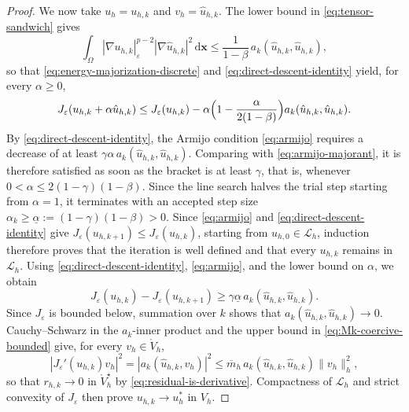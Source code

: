 \documentclass[11pt,pdflatex,sn-mathphys-num]{sn-jnl}
\theoremstyle{thmstyleone}%
\theoremstyle{thmstyletwo}%
\theoremstyle{thmstylethree}%
\newcommand{\bs}[1]{\ensuremath{\boldsymbol{#1}}}
\begin{document}
\begin{proof}
We now take $u_h=u_{h,k}$ and $v_h=\hat u_{h,k}$. The lower bound in \eqref{eq:tensor-sandwich} gives
\begin{equation*}
  \int_\Omega|\nabla u_{h,k}|_\varepsilon^{p-2}|\nabla\hat u_{h,k}|^2\,\mathrm{d}\bs x
  \le\frac{1}{1-\beta}\,a_k(\hat u_{h,k},\hat u_{h,k}),
\end{equation*}
so that \eqref{eq:energy-majorization-discrete} and \eqref{eq:direct-descent-identity} yield, for every $\alpha\ge0$,
\begin{equation}\label{eq:armijo-majorant}
  J_\varepsilon(u_{h,k}+\alpha\hat u_{h,k})
  \le J_\varepsilon(u_{h,k})
  -\alpha\Bigl(1-\frac{\alpha}{2(1-\beta)}\Bigr)
   a_k(\hat u_{h,k},\hat u_{h,k}).
\end{equation}
By \eqref{eq:direct-descent-identity}, the Armijo condition \eqref{eq:armijo} requires a decrease of at least $\gamma\alpha\,a_k(\hat u_{h,k},\hat u_{h,k})$. Comparing with \eqref{eq:armijo-majorant}, it is therefore satisfied as soon as the bracket is at least $\gamma$, that is,
whenever $0<\alpha\le2(1-\gamma)(1-\beta)$. Since the line search halves the trial step
starting from $\alpha=1$, it terminates with an accepted step size
$\alpha_k\ge\underline\alpha:=(1-\gamma)(1-\beta)>0$.
Since \eqref{eq:armijo} and \eqref{eq:direct-descent-identity} give $J_\varepsilon(u_{h,k+1})\le J_\varepsilon(u_{h,k})$, starting from
$u_{h,0}\in\mathcal L_h$, induction therefore proves that the iteration is
well defined and that every $u_{h,k}$ remains in $\mathcal L_h$.
Using \eqref{eq:direct-descent-identity}, \eqref{eq:armijo}, and the lower bound on $\alpha$, we obtain
\begin{equation*}
  J_\varepsilon(u_{h,k})-J_\varepsilon(u_{h,k+1})
  \ge \gamma\underline\alpha\,
  a_k(\hat u_{h,k},\hat u_{h,k}).
\end{equation*}
Since $J_\varepsilon$ is bounded below, summation over $k$ shows that $a_k(\hat u_{h,k},\hat u_{h,k})\to 0$. Cauchy--Schwarz in the  $a_k$-inner product and the upper bound in
\eqref{eq:Mk-coercive-bounded} give, for every $v_h\in\mathring V_h$,
\begin{equation*}
  |J_\varepsilon'(u_{h,k})v_h|^2
  =|a_k(\hat u_{h,k},v_h)|^2
  \le \overline m_h\, a_k(\hat u_{h,k},\hat u_{h,k})\|v_h\|_h^2,
\end{equation*}
so that $r_{h,k}\to0$ in $\mathring V_h^\star$ by \eqref{eq:residual-is-derivative}. Compactness of $\mathcal L_h$ and strict convexity of $J_\varepsilon$ then prove $u_{h,k}\to u_h^*$ in $V_h$.
\end{proof}
\end{document}
